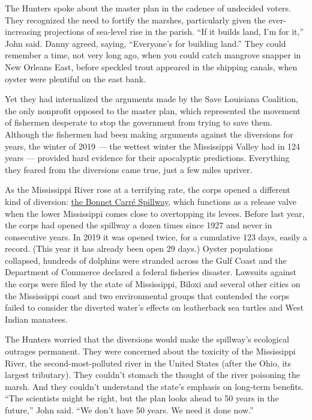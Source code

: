 The Hunters spoke about the master plan in the cadence of undecided
voters. They recognized the need to fortify the marshes, particularly
given the ever-increasing projections of sea-level rise in the parish.
``If it builds land, I'm for it,'' John said. Danny agreed, saying,
``Everyone's for building land.'' They could remember a time, not very
long ago, when you could catch mangrove snapper in New Orleans East,
before speckled trout appeared in the shipping canals, when oyster were
plentiful on the east bank.

Yet they had internalized the arguments made by the Save Louisiana
Coalition, the only nonprofit opposed to the master plan, which
represented the movement of fishermen desperate to stop the government
from trying to save them. Although the fishermen had been making
arguments against the diversions for years, the winter of 2019 --- the
wettest winter the Mississippi Valley had in 124 years --- provided hard
evidence for their apocalyptic predictions. Everything they feared from
the diversions came true, just a few miles upriver.

As the Mississippi River rose at a terrifying rate, the corps opened a
different kind of diversion:
\href{https://www.mvn.usace.army.mil/Missions/Mississippi-River-Flood-Control/Bonnet-Carre-Spillway-Overview/}{the
Bonnet Carré Spillway}, which functions as a release valve when the
lower Mississippi comes close to overtopping its levees. Before last
year, the corps had opened the spillway a dozen times since 1927 and
never in consecutive years. In 2019 it was opened twice, for a
cumulative 123 days, easily a record. (This year it has already been
open 29 days.) Oyster populations collapsed, hundreds of dolphins were
stranded across the Gulf Coast and the Department of Commerce declared a
federal fisheries disaster. Lawsuits against the corps were filed by the
state of Mississippi, Biloxi and several other cities on the Mississippi
coast and two environmental groups that contended the corps failed to
consider the diverted water's effects on leatherback sea turtles and
West Indian manatees.

The Hunters worried that the diversions would make the spillway's
ecological outrages permanent. They were concerned about the toxicity of
the Mississippi River, the second-most-polluted river in the United
States (after the Ohio, its largest tributary). They couldn't stomach
the thought of the river poisoning the marsh. And they couldn't
understand the state's emphasis on long-term benefits. ``The scientists
might be right, but the plan looks ahead to 50 years in the future,''
John said. ``We don't have 50 years. We need it done now.''

